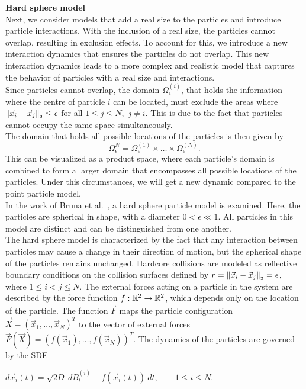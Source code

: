 \textbf{Hard sphere model} \\
Next, we consider models that add a real size to the particles and introduce particle interactions. 
With the inclusion of a real size, the particles cannot overlap, resulting in exclusion effects. 
To account for this, we introduce a new interaction dynamics that ensures the particles do not overlap. 
This new interaction dynamics leads to a more complex and realistic model that captures the behavior of particles with a real size and interactions. \\
Since particles cannot overlap, the domain $\Omega^{(i)}_{\epsilon}$, that holds the information where the centre of particle $i$ can be located, must exclude the areas where $\norm[\vec{x}_i - \vec{x}_j] \leq \epsilon$ for all $1 \leq j \leq N,$ $j \neq i$. 
This is due to the fact that particles cannot occupy the same space simultaneously. \\
The domain that holds all possible locations of the particles is then given by \[\Omega^N_{\epsilon} = \Omega^{(1)}_{\epsilon} \times \ldots \times \Omega^{(N)}_{\epsilon} .\] 
This can be visualized as a product space, where each particle's domain is combined to form a larger domain that encompasses all possible locations of the particles.
Under this circumstances, we will get a new dynamic compared to the point particle model.  \\
In the work of Bruna et al.~\cite{Bruna2012}, a hard sphere particle model is examined.
Here, the particles are spherical in shape, with a diameter $0 < \epsilon \ll 1$.
All particles in this model are distinct and can be distinguished from one another. \\
The hard sphere model is characterized by the fact that any interaction between particles may cause a change in their direction of motion, but the spherical shape of the particles remains unchanged.
Hardcore collisions are modeled as reflective boundary conditions on the collision surfaces defined by $r = \norm[\vec{x}_i - \vec{x}_j] = \epsilon$, where $1 \leq i < j \leq N$.
The external forces acting on a particle in the system are described by the force function $f: \mathbb{R}^2 \rightarrow \mathbb{R}^2$, which depends only on the location of the particle.
The function $\vec{F}$ maps the particle configuration $\vec{X} = (\vec{x}_1, \ldots, \vec{x}_N)^T$ to the vector of external forces $\vec{F}(\vec{X}) = (f(\vec{x}_1), \ldots, f(\vec{x}_N))^T$.
The dynamics of the particles are governed by the SDE
\begin{center}
	$d\vec{x}_i(t) = \sqrt{2D} \: dB_t^{(i)} + f(\vec{x}_i(t)) \: dt, \qquad 1 \leq i \leq N$.
\end{center}

